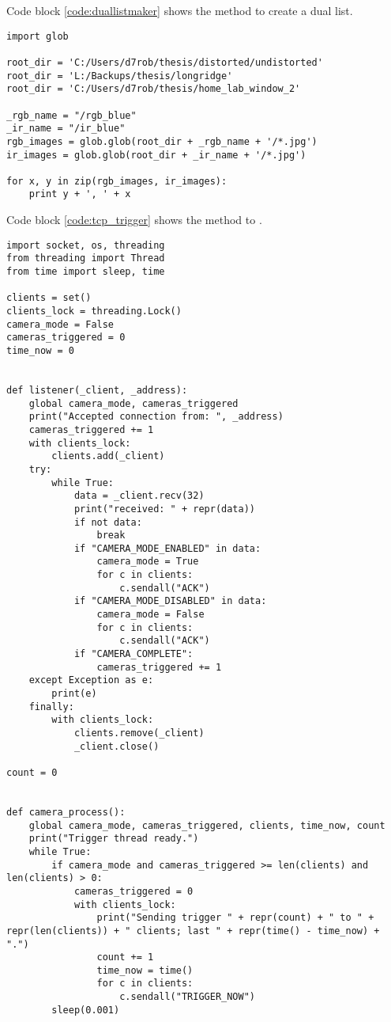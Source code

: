 \begin{appendices}
\newpage
Code block \ref{code:duallistmaker} shows the method to create a dual list.

\begin{lstlisting}
import glob

root_dir = 'C:/Users/d7rob/thesis/distorted/undistorted'
root_dir = 'L:/Backups/thesis/longridge'
root_dir = 'C:/Users/d7rob/thesis/home_lab_window_2'

_rgb_name = "/rgb_blue"
_ir_name = "/ir_blue"
rgb_images = glob.glob(root_dir + _rgb_name + '/*.jpg')
ir_images = glob.glob(root_dir + _ir_name + '/*.jpg')

for x, y in zip(rgb_images, ir_images):
    print y + ', ' + x

\end{lstlisting}


Code block \ref{code:tcp_trigger} shows the method to .

\begin{lstlisting}
import socket, os, threading
from threading import Thread
from time import sleep, time

clients = set()
clients_lock = threading.Lock()
camera_mode = False
cameras_triggered = 0
time_now = 0


def listener(_client, _address):
    global camera_mode, cameras_triggered
    print("Accepted connection from: ", _address)
    cameras_triggered += 1
    with clients_lock:
        clients.add(_client)
    try:
        while True:
            data = _client.recv(32)
            print("received: " + repr(data))
            if not data:
                break
            if "CAMERA_MODE_ENABLED" in data:
                camera_mode = True
                for c in clients:
                    c.sendall("ACK")
            if "CAMERA_MODE_DISABLED" in data:
                camera_mode = False
                for c in clients:
                    c.sendall("ACK")
            if "CAMERA_COMPLETE":
                cameras_triggered += 1
    except Exception as e:
        print(e)
    finally:
        with clients_lock:
            clients.remove(_client)
            _client.close()

count = 0


def camera_process():
    global camera_mode, cameras_triggered, clients, time_now, count
    print("Trigger thread ready.")
    while True:
        if camera_mode and cameras_triggered >= len(clients) and len(clients) > 0:
            cameras_triggered = 0
            with clients_lock:
                print("Sending trigger " + repr(count) + " to " + repr(len(clients)) + " clients; last " + repr(time() - time_now) + ".")
                count += 1
                time_now = time()
                for c in clients:
                    c.sendall("TRIGGER_NOW")
        sleep(0.001)


\end{lstlisting}
\end{appendices}
